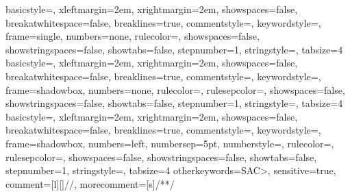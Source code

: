 \usepackage{listings}	
\usepackage[usenames,dvipsnames,svgnames]{xcolor} %
\lstset{
    basicstyle=\ttfamily,	%
}
 {
    basicstyle=\small\ttfamily,
    xleftmargin=2em,
    xrightmargin=2em,
    showspaces=false,
    breakatwhitespace=false,
    breaklines=true,
    commentstyle=\color[rgb]{0,0.6,0},
    keywordstyle=\color{blue},
    frame=single,
    numbers=none,
    rulecolor=\color{blue},
    showspaces=false,
    showstringspaces=false,
    showtabs=false,
    stepnumber=1,
    stringstyle=\color[rgb]{0.58,0,0.82},
    tabsize=4
}
 {
    basicstyle=\small\ttfamily,
    xleftmargin=2em,
    xrightmargin=2em,
    showspaces=false,
    breakatwhitespace=false,
    breaklines=true,
    commentstyle=\color[rgb]{0,0.6,0},
    keywordstyle=\color{blue},
    frame=shadowbox,
    numbers=none,
    rulecolor=\color{black},
    rulesepcolor=\color{blue},
    showspaces=false,
    showstringspaces=false,
    showtabs=false,
    stepnumber=1,
    stringstyle=\color[rgb]{0.58,0,0.82},
    tabsize=4
}
 {
    basicstyle=\small\ttfamily,
    xleftmargin=2em,
    xrightmargin=2em,
    showspaces=false,
    breakatwhitespace=false,
    breaklines=true,
    commentstyle=\color[rgb]{0,0.6,0},
    keywordstyle=\color{blue},
    frame=shadowbox,
    numbers=left,
    numbersep=5pt,
    numberstyle=\small\color[rgb]{0.5,0.5,0.5},
    rulecolor=\color{black},
    rulesepcolor=\color{blue},
    showspaces=false,
    showstringspaces=false,
    showtabs=false,
    stepnumber=1,
    stringstyle=\color[rgb]{0.58,0,0.82},
    tabsize=4
}
 {
    otherkeywords={SAC>},   %
    sensitive=true,
    comment=[l][{\color[rgb]{0,0.4,0}}]{//},
    morecomment=[s]{/*}{*/}
}

